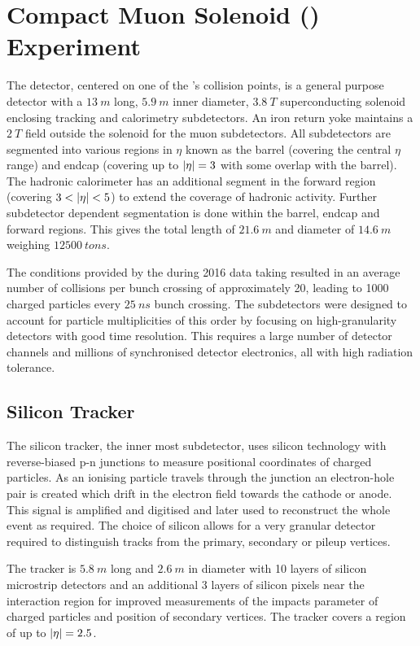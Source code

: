 \section{Compact Muon Solenoid (\CMS) Experiment}

The \CMS detector, centered on one of the \LHC's collision points, is a general
purpose detector with a ${\SI{13}{m}}$ long, ${\SI{5.9}{m}}$ inner diameter,
${\SI{3.8}{T}}$ superconducting solenoid enclosing tracking and calorimetry
subdetectors. An iron return yoke maintains a ${\SI{2}{T}}$ field outside the
solenoid for the muon subdetectors. All subdetectors are segmented into various
regions in $\eta$ known as the barrel (covering the central $\eta$ range) and
endcap (covering up to $|\eta|=3$ with some overlap with the barrel). The
hadronic calorimeter has an additional segment in the forward region (covering
$3<\aeta<5$) to extend the coverage of hadronic activity. Further subdetector
dependent segmentation is done within the barrel, endcap and forward regions.
This gives \CMS the total length of ${\SI{21.6}{m}}$ and diameter of
${\SI{14.6}{m}}$ weighing ${\SI{12500}{tons}}$.

The conditions provided by the \LHC during 2016 data taking resulted in an
average number of collisions per bunch crossing of approximately 20, leading
to 1000 charged particles every ${\SI{25}{ns}}$ bunch crossing. The
subdetectors were designed to account for particle multiplicities of this order
by focusing on high-granularity detectors with good time resolution. This
requires a large number of detector channels and millions of synchronised
detector electronics, all with high radiation tolerance.

\subsection{Silicon Tracker}

The silicon tracker, the inner most subdetector, uses silicon technology with
reverse-biased p-n junctions to measure positional coordinates of charged
particles. As an ionising particle travels through the junction an electron-hole
pair is created which drift in the electron field towards the cathode or anode.
This signal is amplified and digitised and later used to reconstruct the whole
event as required. The choice of silicon allows for a very granular detector
required to distinguish tracks from the primary, secondary or pileup vertices.

The tracker is ${\SI{5.8}{m}}$ long and ${\SI{2.6}{m}}$ in diameter with 10
layers of silicon microstrip detectors and an additional 3 layers of silicon
pixels near the interaction region for improved measurements of the impacts
parameter of charged particles and position of secondary vertices. The tracker
covers a region of up to ${|\eta|=2.5}$.

